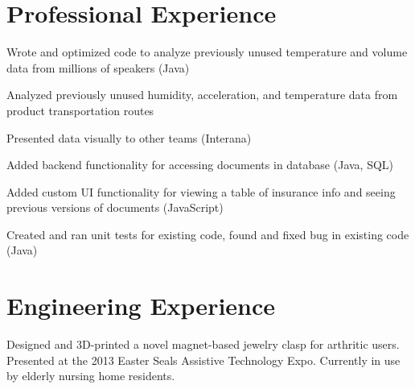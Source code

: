 \documentclass[]{jackie_loven_resume}
\begin{document}
\begin{minipage}[t]{0.66\textwidth} 


\section{Professional Experience}

\vspace{\topsep} %
\begin{tightemize}
\item Wrote and optimized code to analyze previously unused temperature and volume data from millions of speakers (Java)
\item Analyzed previously unused humidity, acceleration, and temperature data from product transportation routes
\item Presented data visually to other teams (Interana)
\end{tightemize}
\sectionsep

\begin{tightemize}
\item Added backend functionality for accessing documents in database (Java, SQL)
\item Added custom UI functionality for viewing a table of insurance info and seeing previous versions of documents (JavaScript)
\item Created and ran unit tests for existing code, found and fixed bug in existing code (Java)
\end{tightemize}
\sectionsep



\section{Engineering Experience}

Designed and 3D-printed a novel magnet-based jewelry clasp for arthritic users. Presented at the 2013 Easter Seals Assistive Technology Expo. Currently in use by elderly nursing home residents.
\sectionsep


\end{minipage}
\end{document}
